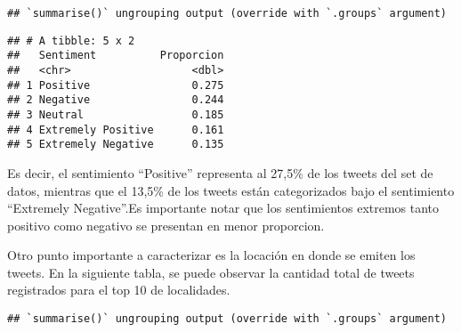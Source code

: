 \documentclass[
]{article}
\newenvironment{Shaded}{\begin{snugshade}}{\end{snugshade}}
\newcommand{\DataTypeTok}[1]{\textcolor[rgb]{0.13,0.29,0.53}{#1}}
\newcommand{\DecValTok}[1]{\textcolor[rgb]{0.00,0.00,0.81}{#1}}
\newcommand{\KeywordTok}[1]{\textcolor[rgb]{0.13,0.29,0.53}{\textbf{#1}}}
\newcommand{\NormalTok}[1]{#1}
\newcommand{\OperatorTok}[1]{\textcolor[rgb]{0.81,0.36,0.00}{\textbf{#1}}}
\newcommand{\StringTok}[1]{\textcolor[rgb]{0.31,0.60,0.02}{#1}}
\begin{document}
\begin{verbatim}
## `summarise()` ungrouping output (override with `.groups` argument)
\end{verbatim}

\begin{verbatim}
## # A tibble: 5 x 2
##   Sentiment          Proporcion
##   <chr>                   <dbl>
## 1 Positive                0.275
## 2 Negative                0.244
## 3 Neutral                 0.185
## 4 Extremely Positive      0.161
## 5 Extremely Negative      0.135
\end{verbatim}

Es decir, el sentimiento ``Positive'' representa al 27,5\% de los tweets
del set de datos, mientras que el 13,5\% de los tweets están
categorizados bajo el sentimiento ``Extremely Negative''.Es importante
notar que los sentimientos extremos tanto positivo como negativo se
presentan en menor proporcion.

Otro punto importante a caracterizar es la locación en donde se emiten
los tweets. En la siguiente tabla, se puede observar la cantidad total
de tweets registrados para el top 10 de localidades.

\begin{Shaded}
\end{Shaded}

\begin{verbatim}
## `summarise()` ungrouping output (override with `.groups` argument)
\end{verbatim}
\end{document}
